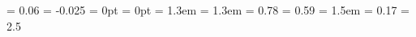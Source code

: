 %
%
%
%
%
%
\usepackage{layout}
%
%
\hoffset = 0.06\paperwidth
\voffset = -0.025\paperheight
\oddsidemargin = 0pt
\topmargin = 0pt
\headheight = 1.3em
\headsep = 1.3em
\textheight = 0.78\paperheight
\textwidth = 0.59\paperwidth
\marginparsep = 1.5em
\marginparwidth = 0.17\paperwidth
\footskip = 2.5\headheight
